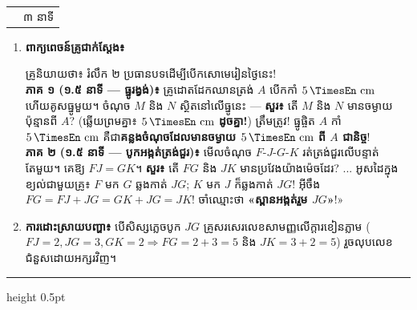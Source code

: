 \documentclass[a4paper,12pt]{article}
\makeatletter
\newcommand{\en}[1]{{\TimesEn #1}}
\newcommand{\enbf}[1]{{\TimesEn\textbf{#1}}}
\newcommand{\unit}[1]{\,\text{\en{#1}}}
\newenvironment{phasebox}[3]{%
  \needspace{2.2cm}%
  \begin{tcolorbox}[
    enhanced, sharp corners, colback=headgray, colframe=black,
    boxrule=1.0pt, top=3.5pt, bottom=3.5pt, left=9pt, right=9pt,
    before skip=6pt, after skip=3pt
  ]%
    \linespread{1.0}\selectfont\renewcommand{\arraystretch}{1.0}%
    \begin{tabular*}{\linewidth}{@{}>{\raggedright\arraybackslash}p{13.10cm}@{\extracolsep{\fill}}r@{}}
      {\muol\fontsize{11pt}{14.5pt}\selectfont #1} & {\fontsize{10.5pt}{13.5pt}\selectfont\en{#2 |} #3}%
    \end{tabular*}%
  \end{tcolorbox}%
  \begingroup\fontsize{11.5pt}{14.92pt}\selectfont
}{%
  \par\endgroup\vspace{3pt}\hrule height 0.5pt\vspace{4pt}%
}
\makeatother
\begin{document}
\begin{phasebox}{ជំហានទី ២ \enbf{(}ខ\enbf{)}៖ រំលឹករហ័ស ២ ភាគ \enbf{(Locus \& Segment Bridge)}}{05--08 min}{៣ នាទី}
  \begin{enumerate}[leftmargin=0.45cm, topsep=1.5pt, itemsep=2.2pt, parsep=0pt]
    \item \textbf{ពាក្យពេចន៍គ្រូជាក់ស្ដែង៖}
      \begin{scriptbox}
        {\muol\fontsize{10.8pt}{14.5pt}\selectfont \enbf{«}គ្រូនិយាយថា៖} រំលឹក ២ ប្រធានបទដើម្បីបើកសោមេរៀនថ្ងៃនេះ!\\
        \textbf{ភាគ ១ (១.៥ នាទី — ធ្នូរង្វង់)៖} គ្រូដោតដែកឈានត្រង់ $A$ បើកកាំ $5\unit{cm}$ ហើយគូសធ្នូមួយ។ ចំណុច $M$ និង $N$ ស្ថិតនៅលើធ្នូនេះ — \textbf{សួរ៖} តើ $M$ និង $N$ មានចម្ងាយប៉ុន្មានពី $A$? (ឆ្លើយព្រមគ្នា៖ \textbf{$5\unit{cm}$ ដូចគ្នា!}) ត្រឹមត្រូវ! ធ្នូផ្ចិត $A$ កាំ $5\unit{cm}$ គឺជា\textbf{គន្លងចំណុចដែលមានចម្ងាយ $5\unit{cm}$ ពី $A$ ជានិច្ច}!\\
        \textbf{ភាគ ២ (១.៥ នាទី — បូកអង្កត់ត្រង់ជួរ)៖} មើលចំណុច $F\text{-}J\text{-}G\text{-}K$ រត់ត្រង់ជួរលើបន្ទាត់តែមួយ។ គេឱ្យ $FJ = GK$។ \textbf{សួរ៖} តើ $FG$ និង $JK$ មានប្រវែងយ៉ាងម៉េចដែរ? ... អូសដៃក្នុងខ្យល់ជាមួយគ្រូ៖ $F$ មក $G$ ឆ្លងកាត់ $JG$; $K$ មក $J$ ក៏ឆ្លងកាត់ $JG$! អ៊ីចឹង $FG = FJ + JG = GK + JG = JK$! ចាំឈ្មោះថា \textbf{«ស្ពានអង្កត់រួម $JG$»}!»
      \end{scriptbox}
    \item \textbf{ការដោះស្រាយបញ្ហា៖} បើសិស្សភ្លេចបូក $JG$ គ្រូសរសេរលេខសាមញ្ញលើក្ដារខៀនភ្លាម ($FJ=2, JG=3, GK=2 \Rightarrow FG=2+3=5$ និង $JK=3+2=5$) រួចលុបលេខជំនួសដោយអក្សរវិញ។
  \end{enumerate}
\end{phasebox}
\end{document}
